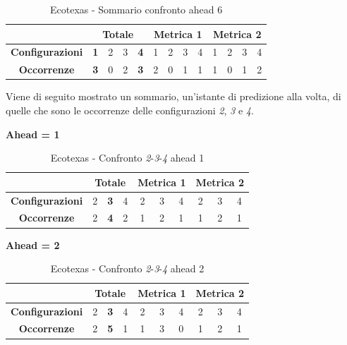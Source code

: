 \documentclass[12pt,a4paper,oneside,openright]{book}
\begin{document}
\begin{table}[H]
\centering
\begin{tabular}{|c|c|c|c|c|c|c|c|c|c|c|c|c|}
\hline
 & \multicolumn{4}{|c|}{\textbf{Totale}} & \multicolumn{4}{|c|}{\textbf{Metrica 1}} & \multicolumn{4}{|c|}{\textbf{Metrica 2}} \\
\hline
\textbf{Configurazioni} & \textbf{1} & 2 & 3 & \textbf{4} & 1 & 2 & 3 & 4 & 1 & 2 & 3 & 4 \\
\hline
\textbf{Occorrenze} & \textbf{3} & 0 & 2 & \textbf{3} & 2 & 0 & 1 & 1 & 1 & 0 & 1 & 2\\
\hline
\end{tabular}
\caption{Ecotexas - Sommario confronto ahead 6}
\end{table} 

Viene di seguito mostrato un sommario, un'istante di predizione alla volta, di quelle che sono le occorrenze delle configurazioni \textit{2}, \textit{3} e \textit{4}.

\medskip

\medskip
\textbf{Ahead = 1}


\begin{table}[H]
\centering
\begin{tabular}{|c|c|c|c|c|c|c|c|c|c|}
\hline
 & \multicolumn{3}{|c|}{\textbf{Totale}} & \multicolumn{3}{|c|}{\textbf{Metrica 1}} & \multicolumn{3}{|c|}{\textbf{Metrica 2}} \\
\hline
\textbf{Configurazioni} & 2 & \textbf{3} & 4 & 2 & 3 & 4 & 2 & 3 & 4 \\
\hline
\textbf{Occorrenze} & 2 & \textbf{4} & 2 & 1 & 2 & 1 & 1 & 2 & 1 \\
\hline
\end{tabular}
\caption{Ecotexas - Confronto \textit{2}-\textit{3}-\textit{4} ahead 1}
\end{table}

\medskip
\textbf{Ahead = 2}


\begin{table}[H]
\centering
\begin{tabular}{|c|c|c|c|c|c|c|c|c|c|}
\hline
 & \multicolumn{3}{|c|}{\textbf{Totale}} & \multicolumn{3}{|c|}{\textbf{Metrica 1}} & \multicolumn{3}{|c|}{\textbf{Metrica 2}} \\
\hline
\textbf{Configurazioni} & 2 & \textbf{3} & 4 & 2 & 3 & 4 & 2 & 3 & 4 \\
\hline
\textbf{Occorrenze} & 2 & \textbf{5} & 1 & 1 & 3 & 0 & 1 & 2 & 1 \\
\hline
\end{tabular}
\caption{Ecotexas - Confronto \textit{2}-\textit{3}-\textit{4} ahead 2}
\end{table}
\end{document}
